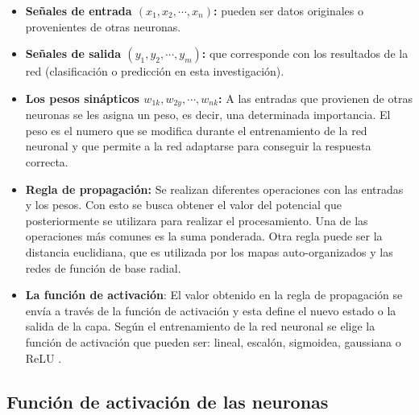 \documentclass[12pt,letterpaper,oneside,openright]{book}
\begin{document}
	\begin{itemize}
		\item \textbf{Señales de entrada $(x_1, x_2,\dotsb,x_n)$:} pueden ser datos originales o provenientes de otras neuronas.
		\item \textbf{Señales de salida $(y_1,y_2,\dotsb,y_m)$:} que corresponde con los resultados de la red (clasificación o predicción en esta investigación).
		\item \textbf{Los pesos sinápticos $w_{1k},w_{2y},\dotsb,w_{nk}$:} A las entradas que provienen de otras neuronas se les asigna un peso, es decir, una determinada importancia. El peso es el numero que se modifica durante el entrenamiento de la red neuronal y que permite a la red adaptarse para conseguir la respuesta correcta.
		\item \textbf{Regla de propagación:} Se realizan diferentes operaciones con las entradas y los pesos. Con esto se busca obtener el valor del potencial que posteriormente se utilizara para realizar el procesamiento. Una de las operaciones más comunes es la suma ponderada. Otra regla puede ser la distancia euclidiana, que es utilizada por los mapas auto-organizados y las redes de función de base radial. 
		\item \textbf{La función de activación}: El valor obtenido en la regla de propagación se envía a través de la función de activación y esta define el nuevo estado o la salida de la capa. Según el entrenamiento de la red neuronal se elige la función de activación que pueden ser: lineal, escalón, sigmoidea, gaussiana o ReLU \cite{stephani}.
	\end{itemize}

	\subsection{Función de activación de las neuronas}
	
\end{document}
